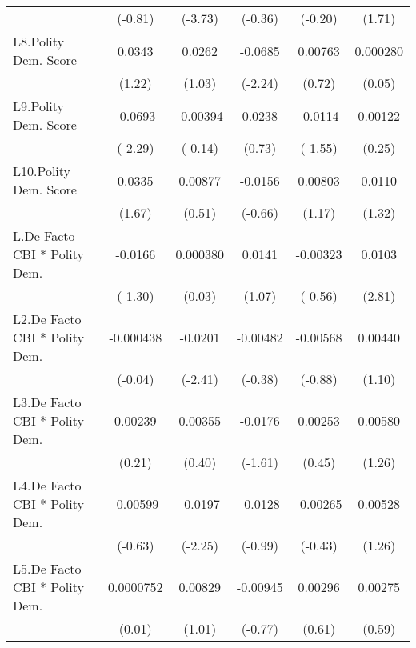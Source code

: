 {\begin{longtable}{l*{5}{c}}
                &  (-0.81)         &  (-3.73)         &  (-0.36)         &  (-0.20)         &   (1.71)         \\
[1em]
L8.Polity Dem. Score&   0.0343         &   0.0262         &  -0.0685\sym{*}  &  0.00763         & 0.000280         \\
                &   (1.22)         &   (1.03)         &  (-2.24)         &   (0.72)         &   (0.05)         \\
[1em]
L9.Polity Dem. Score&  -0.0693\sym{*}  & -0.00394         &   0.0238         &  -0.0114         &  0.00122         \\
                &  (-2.29)         &  (-0.14)         &   (0.73)         &  (-1.55)         &   (0.25)         \\
[1em]
L10.Polity Dem. Score&   0.0335         &  0.00877         &  -0.0156         &  0.00803         &   0.0110         \\
                &   (1.67)         &   (0.51)         &  (-0.66)         &   (1.17)         &   (1.32)         \\
[1em]
L.De Facto CBI * Polity Dem.&  -0.0166         & 0.000380         &   0.0141         & -0.00323         &   0.0103\sym{**} \\
                &  (-1.30)         &   (0.03)         &   (1.07)         &  (-0.56)         &   (2.81)         \\
[1em]
L2.De Facto CBI * Polity Dem.&-0.000438         &  -0.0201\sym{*}  & -0.00482         & -0.00568         &  0.00440         \\
                &  (-0.04)         &  (-2.41)         &  (-0.38)         &  (-0.88)         &   (1.10)         \\
[1em]
L3.De Facto CBI * Polity Dem.&  0.00239         &  0.00355         &  -0.0176         &  0.00253         &  0.00580         \\
                &   (0.21)         &   (0.40)         &  (-1.61)         &   (0.45)         &   (1.26)         \\
[1em]
L4.De Facto CBI * Polity Dem.& -0.00599         &  -0.0197\sym{*}  &  -0.0128         & -0.00265         &  0.00528         \\
                &  (-0.63)         &  (-2.25)         &  (-0.99)         &  (-0.43)         &   (1.26)         \\
[1em]
L5.De Facto CBI * Polity Dem.&0.0000752         &  0.00829         & -0.00945         &  0.00296         &  0.00275         \\
                &   (0.01)         &   (1.01)         &  (-0.77)         &   (0.61)         &   (0.59)         \\

\end{longtable}}
